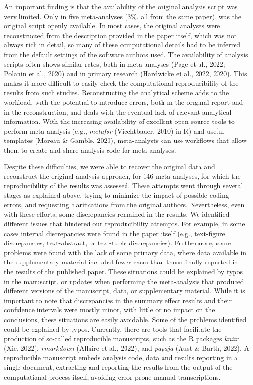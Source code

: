 \documentclass[
  ,man,floatsintext]{apa6}
\begin{document}
An important finding is that the availability of the original analysis script was very limited. Only in five meta-analyses (3\%, all from the same paper), was the original script openly available. In most cases, the original analyses were reconstructed from the description provided in the paper itself, which was not always rich in detail, so many of these computational details had to be inferred from the default settings of the software authors used. The availability of analysis scripts often shows similar rates, both in meta-analyses (Page et al., 2022; Polanin et al., 2020) and in primary research (Hardwicke et al., 2022, 2020). This makes it more difficult to easily check the computational reproducibility of the results from such studies. Reconstructing the analytical scheme adds to the workload, with the potential to introduce errors, both in the original report and in the reconstruction, and deals with the eventual lack of relevant analytical information. With the increasing availability of excellent open-source tools to perform meta-analysis (e.g., \emph{metafor} (Viechtbauer, 2010) in R) and useful templates (Moreau \& Gamble, 2020), meta-analysts can use workflows that allow them to create and share analysis code for meta-analyses.

Despite these difficulties, we were able to recover the original data and reconstruct the original analysis approach, for 146 meta-analyses, for which the reproducibility of the results was assessed. These attempts went through several stages as explained above, trying to minimize the impact of possible coding errors, and requesting clarifications from the original authors. Nevertheless, even with these efforts, some discrepancies remained in the results. We identified different issues that hindered our reproducibility attempts. For example, in some cases internal discrepancies were found in the paper itself (e.g., text-figure discrepancies, text-abstract, or text-table discrepancies). Furthermore, some problems were found with the lack of some primary data, where data available in the supplementary material included fewer cases than those finally reported in the results of the published paper. These situations could be explained by typos in the manuscript, or updates when performing the meta-analysis that produced different versions of the manuscript, data, or supplementary material. While it is important to note that discrepancies in the summary effect results and their confidence intervals were mostly minor, with little or no impact on the conclusions, these situations are easily avoidable. Some of the problems identified could be explained by typos. Currently, there are tools that facilitate the production of so-called reproducible manuscripts, such as the R packages \emph{knitr} (Xie, 2022), \emph{rmarkdown} (Allaire et al., 2022), and \emph{papaja} (Aust \& Barth, 2022). A reproducible manuscript embeds analysis code, data and results reporting in a single document, extracting and reporting the results from the output of the computational process itself, avoiding error-prone manual transcriptions.
\end{document}
